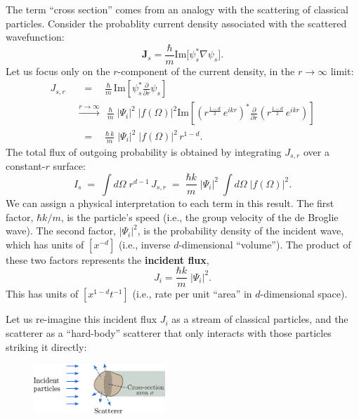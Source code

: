 \documentclass[pra,12pt]{revtex4}
\begin{document}
The term ``cross section'' comes from an analogy with the scattering
of classical particles.  Consider the probablity current density
associated with the scattered wavefunction:
\begin{equation}
  \mathbf{J}_s = \frac{\hbar}{m} \mathrm{Im}\big[\psi_s^*\nabla\psi_s\big].
\end{equation}
Let us focus only on the $r$-component of the current density, in the
$r\rightarrow\infty$ limit:
\begin{equation}
  \begin{aligned}J_{s,r}\; &\;\;=\;\;\;\, \frac{\hbar}{m}\, \mathrm{Im}\left[\psi_s^* \frac{\partial}{\partial r}\psi_s\right] \\ &\overset{r\rightarrow\infty}{\longrightarrow}\;\, \frac{\hbar}{m}\; |\Psi_i|^2 \; |f(\Omega)|^2 \mathrm{Im}\left[\left(r^{\frac{1-d}{2}} \, e^{ikr}\right)^* \frac{\partial}{\partial r} \left(r^{\frac{1-d}{2}} \, e^{ikr}\right)\right] \\ & \;\;=\;\;\;\, \frac{\hbar \,k}{m}\; |\Psi_i|^2 \; |f(\Omega)|^2 \,r^{1-d}.\end{aligned}
\end{equation}
The total flux of outgoing probability is obtained by integrating
$J_{s,r}$ over a constant-$r$ surface:
\begin{equation}
  I_s \;=\; \int d\Omega\; r^{d-1} \, J_{s,r} \;=\; \frac{\hbar k}{m} \;|\Psi_i|^2 \; \int d\Omega\; \big|f(\Omega)\big|^2.
  \label{scatterI}
\end{equation}
We can assign a physical interpretation to each term in this
result.  The first factor, $\hbar k/m$, is the
particle's speed (i.e., the group velocity of the de Broglie wave).
The second factor, $|\Psi_i|^2$, is the probability density of the incident
wave, which has units of $[x^{-d}]$ (i.e., inverse $d$-dimensional
``volume'').  The product of these two factors represents the
\textbf{incident flux},
\begin{equation}
  J_{i} = \frac{\hbar k}{m} \;|\Psi_i|^2.
\end{equation}
This has units of $[x^{1-d}t^{-1}]$ (i.e., rate per unit ``area'' in
$d$-dimensional space).

Let us re-imagine this incident flux $J_i$ as a stream of classical
particles, and the scatterer as a ``hard-body'' scatterer that only
interacts with those particles striking it directly:

\begin{figure}[h]
  \centering\includegraphics[width=0.44\textwidth]{crosssection}
\end{figure}
\end{document}
